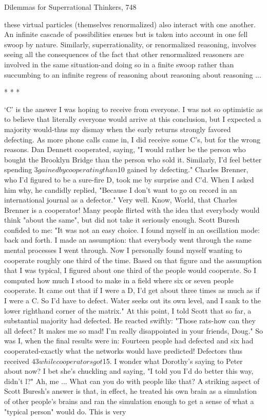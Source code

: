 Dilemmas for Superrational Thinkers,                                                   748

these virtual particles (themselves renormalized) also interact with one another. An
infinite cascade of possibilities ensues but is taken into account in one fell swoop by
nature. Similarly, superrationality, or renormalized reasoning, involves seeing all the
consequences of the fact that other renormalized reasoners are involved in the same
situation-and doing so in a finite swoop rather than succumbing to an infinite regress
of reasoning about reasoning about reasoning ...

                                       *   *   *

        `C' is the answer I was hoping to receive from everyone. I was not so
optimistic as to believe that literally everyone would arrive at this conclusion, but I
expected a majority would-thus my dismay when the early returns strongly favored
defecting. As more phone calls came in, I did receive some C's, but for the wrong
reasons. Dan Dennett cooperated, saying, "I would rather be the person who bought
the Brooklyn Bridge than the person who sold it. Similarly, I'd feel better spending $3
gained by cooperating than $10 gained by defecting."
        Charles Brenner, who I'd figured to be a sure-fire D, took me by surprise and
C'd. When I asked him why, he candidly replied, "Because I don't want to go on
record in an international journal as a defector." Very well. Know, World, that
Charles Brenner is a cooperator!
        Many people flirted with the idea that everybody would think "about the
same", but did not take it seriously enough. Scott Buresh confided to me: "It was not
an easy choice. I found myself in an oscillation mode: back and forth. I made an
assumption: that everybody went through the same mental processes I went through.
Now I personally found myself wanting to cooperate roughly one third of the time.
Based on that figure and the assumption that I was typical, I figured about one third of
the people would cooperate. So I computed how much I stood to make in a field
where six or seven people cooperate. It came out that if I were a D, I'd get about three
times as much as if I were a C. So I'd have to defect. Water seeks out its own level,
and I sank to the lower righthand corner of the matrix." At this point, I told Scott that
so far, a substantial majority had defected. He reacted swiftly: "Those rats-how can
they all defect? It makes me so mad! I'm really disappointed in your friends, Doug."
        So was I, when the final results were in: Fourteen people had defected and six
had cooperated-exactly what the networks would have predicted! Defectors thus
received $43 while cooperators got $15. I wonder what Dorothy's saying to Peter
about now? I bet she's chuckling and saying, "I told you I'd do better this way, didn't
l?" Ah, me ... What can you do with people like that?
        A striking aspect of Scott Buresh's answer is that, in effect, he treated his own
brain as a simulation of other people's brains and ran the simulation enough to get a
sense of what a "typical person" would do. This is very





